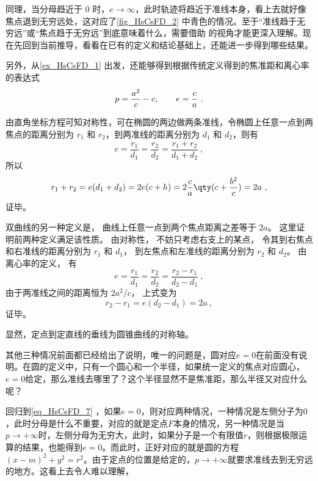 同理，当分母趋近于 $0$ 时，$e \to \infty$，此时轨迹将趋近于准线本身，看上去就好像焦点退到无穷远处，这对应了\autoref{fig_HsCsFD_2} 中青色的情况。至于“准线趋于无穷远”或“焦点趋于无穷远”到底意味着什么，需要借助  的视角才能更深入理解。现在先回到当前推导，看看在已有的定义和结论基础上，还能进一步得到哪些结果。

另外，从\autoref{ex_HsCsFD_1} 出发，还能够得到根据传统定义得到的焦准距和离心率的表达式
\begin{equation}
p={a^2\over c}-c,\qquad e={c\over a}~.
\end{equation}






由直角坐标方程可知对称性，可在椭圆的两边做两条准线，令椭圆上任意一点到两焦点的距离分别为 $r_1$ 和 $r_2$，到两准线的距离分别为 $d_1$ 和 $d_2$，则有
\begin{equation}
e = \frac{r_1}{d_1} = \frac{r_2}{d_2} = \frac{r_1 + r_2}{d_1 + d_2}~,
\end{equation}
所以
\begin{equation}
r_1 + r_2 = e(d_1+d_2) = 2e(c + h) = 2\frac{c}{a} \qty( c + \frac{b^2}{c} ) = 2a~,
\end{equation}
证毕。

双曲线的另一种定义是， 曲线上任意一点到两个焦点距离之差等于 $2a$。 这里证明前两种定义满足该性质。 由对称性， 不妨只考虑右支上的某点， 令其到右焦点和右准线的距离分别为 $r_1$ 和 $d_1$， 到左焦点和左准线的距离分别为 $r_2$ 和 $d_2$。 由离心率的定义， 有
\begin{equation}
e = \frac{r_1}{d_1} = \frac{r_2}{d_2} = \frac{r_2 - r_1}{d_2 - d_1}~,
\end{equation}
由于两准线之间的距离恒为 $2a^2/c$， 上式变为
\begin{equation}
r_2 - r_1 = e(d_2 - d_1) = 2a~,
\end{equation}
证毕。


显然，定点到定直线的垂线为圆锥曲线的对称轴。


其他三种情况前面都已经给出了说明，唯一的问题是，圆对应$e=0$在前面没有说明。在圆的定义中，只有一个圆心和一个半径，如果统一定义的焦点对应圆心，$e=0$给定，那么准线去哪里了？这个半径显然不是焦准距，那么半径又对应什么呢？

回归到\autoref{eq_HsCsFD_7} ，如果$e=0$，则对应两种情况，一种情况是左侧分子为$0$，此时分母是什么不重要，对应的就是定点$F$本身的情况，另一种情况是当$p\to+\infty$时，左侧分母为无穷大，此时，如果分子是一个有限值$r$，则根据极限运算的结果，也能得到$e=0$。而此时，正好对应的就是圆的方程$(x-m)^2+y^2=r^2$。由于定点的位置是给定的，$p\to+\infty$就要求准线去到无穷远的地方。这看上去令人难以理解，



